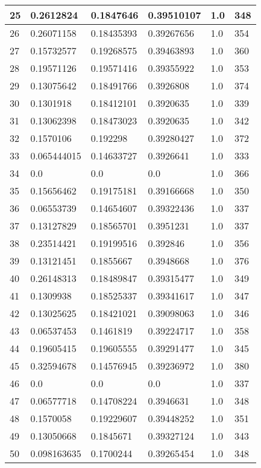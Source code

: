 \begin{longtable}{|l|l|l|l|l|l|}
25 & 0.2612824 & 0.1847646 & 0.39510107 & 1.0 & 348 \\ \hline 
26 & 0.26071158 & 0.18435393 & 0.39267656 & 1.0 & 354 \\ \hline 
27 & 0.15732577 & 0.19268575 & 0.39463893 & 1.0 & 360 \\ \hline 
28 & 0.19571126 & 0.19571416 & 0.39355922 & 1.0 & 353 \\ \hline 
29 & 0.13075642 & 0.18491766 & 0.3926808 & 1.0 & 374 \\ \hline 
30 & 0.1301918 & 0.18412101 & 0.3920635 & 1.0 & 339 \\ \hline 
31 & 0.13062398 & 0.18473023 & 0.3920635 & 1.0 & 342 \\ \hline 
32 & 0.1570106 & 0.192298 & 0.39280427 & 1.0 & 372 \\ \hline 
33 & 0.065444015 & 0.14633727 & 0.3926641 & 1.0 & 333 \\ \hline 
34 & 0.0 & 0.0 & 0.0 & 1.0 & 366 \\ \hline 
35 & 0.15656462 & 0.19175181 & 0.39166668 & 1.0 & 350 \\ \hline 
36 & 0.06553739 & 0.14654607 & 0.39322436 & 1.0 & 337 \\ \hline 
37 & 0.13127829 & 0.18565701 & 0.3951231 & 1.0 & 337 \\ \hline 
38 & 0.23514421 & 0.19199516 & 0.392846 & 1.0 & 356 \\ \hline 
39 & 0.13121451 & 0.1855667 & 0.3948668 & 1.0 & 376 \\ \hline 
40 & 0.26148313 & 0.18489847 & 0.39315477 & 1.0 & 349 \\ \hline 
41 & 0.1309938 & 0.18525337 & 0.39341617 & 1.0 & 347 \\ \hline 
42 & 0.13025625 & 0.18421021 & 0.39098063 & 1.0 & 346 \\ \hline 
43 & 0.06537453 & 0.1461819 & 0.39224717 & 1.0 & 358 \\ \hline 
44 & 0.19605415 & 0.19605555 & 0.39291477 & 1.0 & 345 \\ \hline 
45 & 0.32594678 & 0.14576945 & 0.39236972 & 1.0 & 380 \\ \hline 
46 & 0.0 & 0.0 & 0.0 & 1.0 & 337 \\ \hline 
47 & 0.06577718 & 0.14708224 & 0.3946631 & 1.0 & 348 \\ \hline 
48 & 0.1570058 & 0.19229607 & 0.39448252 & 1.0 & 351 \\ \hline 
49 & 0.13050668 & 0.1845671 & 0.39327124 & 1.0 & 343 \\ \hline 
50 & 0.098163635 & 0.1700244 & 0.39265454 & 1.0 & 348 \\ \hline 
\end{longtable}